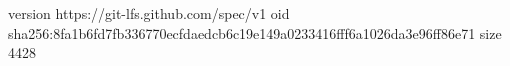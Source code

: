 version https://git-lfs.github.com/spec/v1
oid sha256:8fa1b6fd7fb336770ecfdaedcb6c19e149a0233416fff6a1026da3e96ff86e71
size 4428
